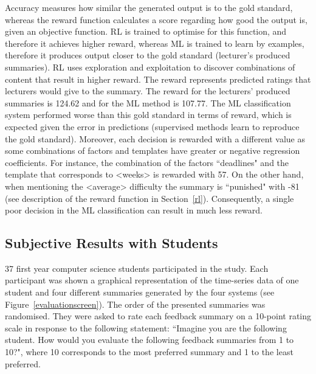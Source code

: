 \documentclass[11pt]{article}
\begin{document}
Accuracy measures how similar the generated output is to the gold standard, 
whereas the reward function calculates a score regarding how good the output is, 
given an objective function. RL is trained to optimise for this function, and
therefore it achieves higher reward, whereas ML is trained to learn by examples, 
therefore it produces output closer to the gold standard (lecturer's produced summaries). RL uses exploration and 
exploitation to discover combinations of content that result in higher reward. The reward represents 
predicted ratings that lecturers would give to the summary. The reward
for the lecturers' produced summaries is 124.62 and for the ML method is 107.77.
The ML classification system performed worse than this gold
standard in terms of reward, which is expected given 
the error in predictions (supervised methods learn to reproduce the gold standard). Moreover, each decision is rewarded 
with a different value as some combinations of factors and templates
 have greater or negative regression coefficients. For instance, the combination of the factors ``deadlines" 
and the template that corresponds to \textless weeks\textgreater{} is rewarded with 57. On the other hand, 
when mentioning the \textless average\textgreater{} difficulty the summary is ``punished" with -81 (see description 
of the reward function in Section~\ref{rl}). 
Consequently, a single poor decision in the ML classification can result in much less reward. 

\subsection{Subjective Results with Students} \label{humanEvaluation}

37 first year computer science students participated in the study. 
Each participant was shown a graphical representation of the time-series data of one student and 
four different summaries generated by the four systems (see  Figure~\ref{evaluationscreen}). The 
order of the presented summaries was randomised.  They were asked to rate each feedback 
summary on a 10-point rating scale in response to the following statement: 
``Imagine you are the following student. How would you evaluate the following feedback 
summaries from 1 to 10?", where 10 corresponds to the most preferred summary and 1 to the 
least preferred. 
\end{document}
